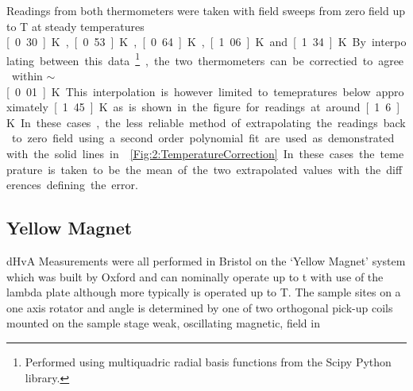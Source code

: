 Readings from both thermometers were taken with field sweeps from zero field up to \unit[18]{T} at steady temperatures \unit[0.30]{K}, \unit[0.53]{K}, \unit[0.64]{K}, \unit[1.06]{K} and \unit[1.34]{K}. By interpolating between this data\footnote{Performed using multiquadric radial basis functions from the Scipy Python library.}, the two thermometers can be correctied to agree within $\sim$\unit[0.01]{K}. This interpolation is however limited to temepratures below approximately \unit[1.45]{K} as is shown in the figure for readings at around \unit[1.6]{K}. In these cases, the less reliable method of extrapolating the readings back to zero field using a second order polynomial fit are used as demonstrated with the solid lines in \fig\ref{Fig:2:TemperatureCorrection}. In these cases the temeprature is taken to be the mean of the two extrapolated values with the differences defining the error.


\subsection{Yellow Magnet}

dHvA Measurements were all performed in Bristol on the `Yellow Magnet' system which was built by Oxford and can nominally operate up to \unit[20]{t} with use of the lambda plate although more typically is operated up to \unit[18]{T}. The sample sites on a one axis rotator and angle is determined by one of two orthogonal pick-up coils mounted on the sample stage weak, oscillating magnetic, field in

